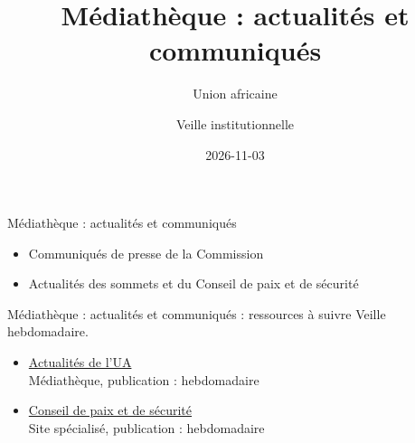 \documentclass[aspectratio=169,11pt]{beamer}
\title{Médiathèque : actualités et communiqués}
\subtitle{Union africaine}
\author{Veille institutionnelle}
\date{2026-11-03}
\begin{document}
\begin{frame}\titlepage\end{frame}

\begin{frame}{Médiathèque : actualités et communiqués}
\begin{itemize}
\item Communiqués de presse de la Commission
\item Actualités des sommets et du Conseil de paix et de sécurité
\end{itemize}
\end{frame}

\begin{frame}{Médiathèque : actualités et communiqués : ressources à suivre}
\small
Veille hebdomadaire.
\begin{itemize}
\item \href{https://au.int/en/pressreleases}{Actualités de l'UA}\\{\footnotesize Médiathèque, publication : hebdomadaire}
\item \href{https://www.peaceau.org}{Conseil de paix et de sécurité}\\{\footnotesize Site spécialisé, publication : hebdomadaire}
\end{itemize}
\end{frame}
\end{document}
